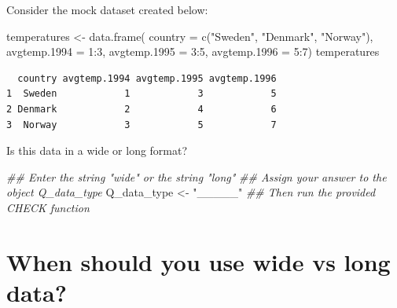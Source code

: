 \documentclass[
  letterpaper,
  DIV=11,
  numbers=noendperiod]{scrreprt}
\newenvironment{Shaded}{\begin{snugshade}}{\end{snugshade}}
\newcommand{\AttributeTok}[1]{\textcolor[rgb]{0.40,0.45,0.13}{#1}}
\newcommand{\DecValTok}[1]{\textcolor[rgb]{0.68,0.00,0.00}{#1}}
\newcommand{\DocumentationTok}[1]{\textcolor[rgb]{0.37,0.37,0.37}{\textit{#1}}}
\newcommand{\FunctionTok}[1]{\textcolor[rgb]{0.28,0.35,0.67}{#1}}
\newcommand{\NormalTok}[1]{\textcolor[rgb]{0.00,0.23,0.31}{#1}}
\newcommand{\OtherTok}[1]{\textcolor[rgb]{0.00,0.23,0.31}{#1}}
\newcommand{\SpecialCharTok}[1]{\textcolor[rgb]{0.37,0.37,0.37}{#1}}
\newcommand{\StringTok}[1]{\textcolor[rgb]{0.13,0.47,0.30}{#1}}
\begin{document}
\begin{tcolorbox}[enhanced jigsaw, title=\textcolor{quarto-callout-tip-color}{\faLightbulb}\hspace{0.5em}{Practice}, colbacktitle=quarto-callout-tip-color!10!white, leftrule=.75mm, arc=.35mm, opacityback=0, bottomrule=.15mm, rightrule=.15mm, toptitle=1mm, breakable, toprule=.15mm, colback=white, coltitle=black, colframe=quarto-callout-tip-color-frame, bottomtitle=1mm, titlerule=0mm, left=2mm, opacitybacktitle=0.6]

Consider the mock dataset created below:

\begin{Shaded}
\begin{Highlighting}[]
\NormalTok{temperatures }\OtherTok{\textless{}{-}} 
  \FunctionTok{data.frame}\NormalTok{(}
    \AttributeTok{country =} \FunctionTok{c}\NormalTok{(}\StringTok{"Sweden"}\NormalTok{, }\StringTok{"Denmark"}\NormalTok{, }\StringTok{"Norway"}\NormalTok{),}
    \AttributeTok{avgtemp.1994 =} \DecValTok{1}\SpecialCharTok{:}\DecValTok{3}\NormalTok{,}
    \AttributeTok{avgtemp.1995 =} \DecValTok{3}\SpecialCharTok{:}\DecValTok{5}\NormalTok{,}
    \AttributeTok{avgtemp.1996 =} \DecValTok{5}\SpecialCharTok{:}\DecValTok{7}\NormalTok{)}
\NormalTok{temperatures}
\end{Highlighting}
\end{Shaded}

\begin{verbatim}
  country avgtemp.1994 avgtemp.1995 avgtemp.1996
1  Sweden            1            3            5
2 Denmark            2            4            6
3  Norway            3            5            7
\end{verbatim}

Is this data in a wide or long format?

\begin{Shaded}
\begin{Highlighting}[]
\DocumentationTok{\#\# Enter the string "wide" or the string "long"}
\DocumentationTok{\#\# Assign your answer to the object Q\_data\_type}
\NormalTok{Q\_data\_type }\OtherTok{\textless{}{-}} \StringTok{"\_\_\_\_\_"}
\DocumentationTok{\#\# Then run the provided CHECK function}
\end{Highlighting}
\end{Shaded}

\end{tcolorbox}

\section{When should you use wide vs long
data?}\label{when-should-you-use-wide-vs-long-data}
\end{document}

